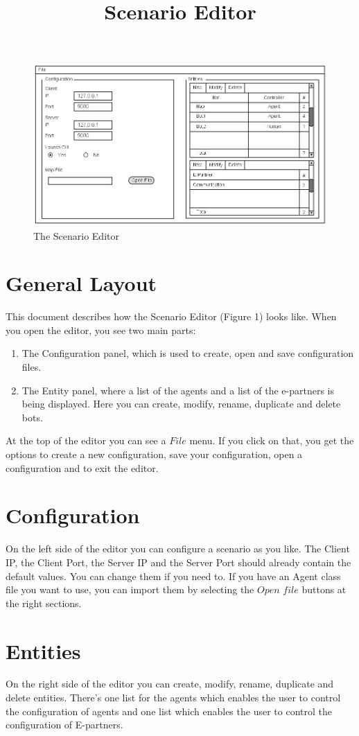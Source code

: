 \documentclass[a4paper]{article}
\title{Scenario Editor}
\date{}
\author{}
\begin{document}
\maketitle

\begin{figure}[h]
\begin{center}
\includegraphics[scale=0.5]{design.jpg}
\end{center}
\caption{The Scenario Editor}
\end{figure}

\section*{General Layout}
This document describes how the Scenario Editor (Figure 1) looks like. When you open the editor, you see two main parts:
\begin{enumerate}
\item The Configuration panel, which is used to create, open and save configuration files.
\item The Entity panel, where a list of the agents and a list of the e-partners is being displayed. Here you can create, modify, rename, duplicate and delete bots.
\end{enumerate}
At the top of the editor you can see a $File$ menu. If you click on that, you get the options to create a new configuration, save your configuration, open a configuration and to exit the editor.

\section*{Configuration}
On the left side of the editor you can configure a scenario as you like. The Client IP, the Client Port, the Server IP and the Server Port should already contain the default values. You can change them if you need to. If you have an Agent class file you want to use, you can import them by selecting the $Open$ $file$ buttons at the right sections.

\section*{Entities}
On the right side of the editor you can create, modify, rename, duplicate and delete entities. There's one list for the agents which enables the user to control the configuration of agents and one list which enables the user to control the configuration of E-partners.
\end{document}

